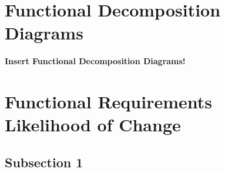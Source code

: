 \documentclass [11pt]{article}
\begin{document}


\section{Functional Decomposition Diagrams}
\textbf{Insert Functional Decomposition Diagrams!}
%	
%
%
%	



\section{Functional Requirements Likelihood of Change} 

\subsection{Subsection 1}
\end{document}
